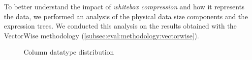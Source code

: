 To better understand the impact of \textit{whitebox compression} and how it represents the data, we performed an analysis of the physical data size components and the expression trees. We conducted this analysis on the results obtained with the VectorWise methodology (\ref{subsec:eval:methodology:vectorwise}).

\begin{figure}[h]
  \centering
  \caption{Column datatype distribution}
  \label{fig:eval:results:columndatatypes}
\end{figure}

